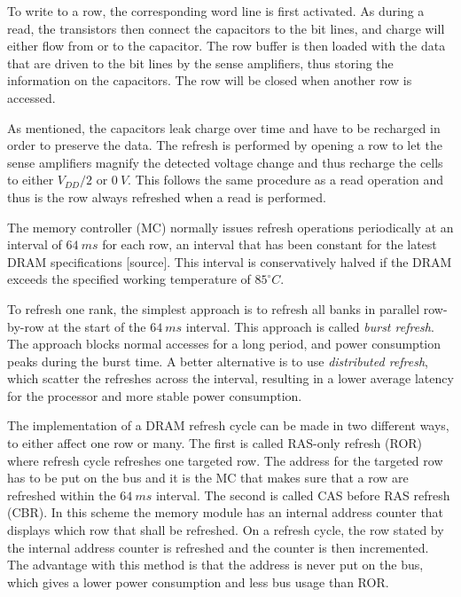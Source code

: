To write to a row, the corresponding word line is first activated. As during a read, the transistors then connect the capacitors to the bit lines, and charge will either flow from or to the capacitor. The row buffer is then loaded with the data that are driven to the bit lines by the sense amplifiers, thus storing the information on the capacitors. The row will be closed when another row is accessed.

As mentioned, the capacitors leak charge over time and have to be recharged in order to preserve the data. The refresh is performed by opening a row to let the sense amplifiers magnify the detected voltage change and thus recharge the cells to either $V_{DD}/2$ or $0\:V$. This follows the same procedure as a read operation and thus is the row always refreshed when a read is performed. %

The memory controller (MC) normally issues refresh operations periodically at an interval of $64\:ms$ for each row, an interval that has been constant for the latest DRAM specifications [source]. This interval is conservatively halved if the DRAM exceeds the specified working temperature of $85^{\circ}C$. 

To refresh one rank, the simplest approach is to refresh all banks in parallel row-by-row at the start of the $64\:ms$ interval. This approach is called \textit{burst refresh}. The approach blocks normal accesses for a long period, and power consumption peaks during the burst time. A better alternative is to use \textit{distributed refresh}, which scatter the refreshes across the interval, resulting in a lower average latency for the processor and more stable power consumption.

The implementation of a DRAM refresh cycle can be made in two different ways, to either affect one row or many. The first is called RAS-only refresh (ROR) where refresh cycle refreshes one targeted row. The address for the targeted row has to be put on the bus and it is the MC that makes sure that a row are refreshed within the $64\:ms$ interval. The second is called CAS before RAS refresh (CBR). In this scheme the memory module has an internal address counter that displays which row that shall be refreshed. On a refresh cycle, the row stated by the internal address counter is refreshed and the counter is then incremented. The advantage with this method is that the address is never put on the bus, which gives a lower power consumption and less bus usage than ROR. 

